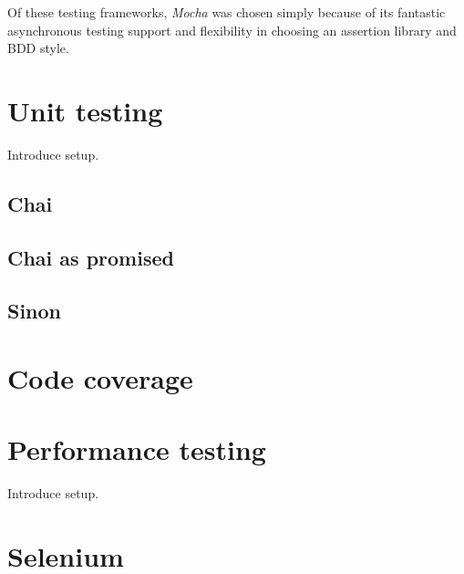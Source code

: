 {{		Of these testing frameworks, \emph{Mocha} was chosen simply because of its fantastic asynchronous testing support and flexibility in choosing an assertion library and BDD style.

	}



}

\section{Unit testing} {

	Introduce setup.

	\subsection{Chai} {

	}

	\subsection{Chai as promised} {
	
	}

	\subsection{Sinon} {

	}

}

\section{Code coverage} {
	

}

\section{Performance testing} {

	Introduce setup.
	
	\section{Selenium} {

	}

}
